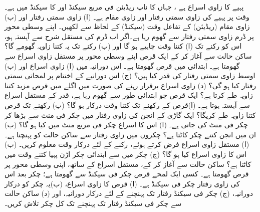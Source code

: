 پہیے کا زاوی اسراع  ہے ، جہاں  کا ناپ  ریڈیئن فی مربع سیکنڈ اور  کا سیکنڈ میں ہے۔ وقت  پر پہیے کی زاوی سمتی
 رفتار  اور زاوی مقام  ہے۔ (ا) زاوی سمتی رفتار    اور (ب) زاوی مقام (ریڈیئن)  کے  تفاعل وقت (سیکنڈ)  کے لحاظ سے لکھیں۔
اپنے وسطی محور پر  ڈرم  زاوی سمتی رفتار سے گھوم رہا ہے۔اگر  اب ڈرم  کی  مستقل شرح سے آہستہ ہو، اس کو رکنے تک  (ا) کتنا وقت چاہیے ہو گا اور (ب) رکنے تک یہ کتنا زاویہ گھومے گا؟
ساکن حالت سے آغاز کر کے ایک قرص اپنے وسطی محور  پر مستقل زاوی اسراع سے گھومتا ہے۔ ابتدائی  میں قرص  گھومتا ہے۔ اس دورانیہ میں (ا) زاوی اسراع اور (ب) اوسط زاوی سمتی رفتار کی قدر کیا ہیں؟ (ج)  اس   دورانیے کے اختتام پر لمحاتی سمتی رفتار  کیا ہو گی؟ (د)   زاوی اسراع برقرار رہنے کی صورت میں اگلے  میں قرص مزید  کتنا  زاویہ طے کرتا ہے؟
ایک قرص جو ابتدائی طور  سے گھوم رہا ہے،  قدر کے مستقل اسراع سے آہستہ ہوتا ہے۔ (ا)قرص کے  رکھنے  تک کتنا وقت  درکار ہو گا؟  (ب)   رکھنے تک قرص کتنا زاویہ طے کریگا؟
ایک گاڑی کے انجن کی زاوی رفتار  میں   چکر فی منٹ سے بڑھا کر  چکر فی منٹ کی جاتی ہے۔ (ا)  اس کا اسراع چکر فی مربع  منٹ میں کیا ہو گا؟ (ب)  ان  میں انجن کتنے چکر کاٹتا ہے؟
       چکروں میں    زاوی رفتار  سے  ساکن حالت کو پہنچتا ہے۔ (ا)  مستقل زاوی اسراع فرض کرتے ہوئے، رکنے کے لئے درکار وقت معلوم کریں۔ (ب)  اس کا زاوی اسراع کیا ہو گا؟ (ج)   چکر میں سے ابتدائی  چکر  اڑن پہیا کتنے  وقت میں کاٹتا ہے؟
ساکن حالت سے آغاز کر کے،   مستقل اسراع کے ساتھ، اپنی وسطی محور پر  قرص گھومتا ہے۔ کسی ایک لمحے قرص   چکر فی سیکنڈ سے گھومتا ہے؛  چکر بعد اس کی زاوی رفتار  چکر فی سیکنڈ ہے۔ (ا) قرص کا زاوی اسراع، (ب)یہ      چکر کو درکار دورانیہ، (ج)   چکر فی سیکنڈ رفتار تک پہنچنے  کے لئے درکار دورانیہ، اور (د)  ساکن حالت سے  چکر فی سیکنڈ رفتار تک پہنچنے تک کل چکر تلاش کریں۔
